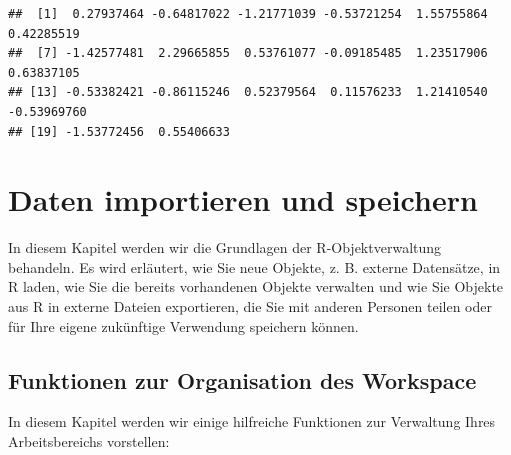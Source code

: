\documentclass[
]{book}
\begin{document}
\begin{verbatim}
##  [1]  0.27937464 -0.64817022 -1.21771039 -0.53721254  1.55755864  0.42285519
##  [7] -1.42577481  2.29665855  0.53761077 -0.09185485  1.23517906  0.63837105
## [13] -0.53382421 -0.86115246  0.52379564  0.11576233  1.21410540 -0.53969760
## [19] -1.53772456  0.55406633
\end{verbatim}

\hypertarget{daten-importieren-und-speichern}{%
\chapter{Daten importieren und speichern}\label{daten-importieren-und-speichern}}

In diesem Kapitel werden wir die Grundlagen der R-Objektverwaltung behandeln. Es wird erläutert, wie Sie neue Objekte, z. B. externe Datensätze, in R laden, wie Sie die bereits vorhandenen Objekte verwalten und wie Sie Objekte aus R in externe Dateien exportieren, die Sie mit anderen Personen teilen oder für Ihre eigene zukünftige Verwendung speichern können.

\hypertarget{funktionen-zur-organisation-des-workspace}{%
\section{Funktionen zur Organisation des Workspace}\label{funktionen-zur-organisation-des-workspace}}

In diesem Kapitel werden wir einige hilfreiche Funktionen zur Verwaltung Ihres Arbeitsbereichs vorstellen:
\end{document}
